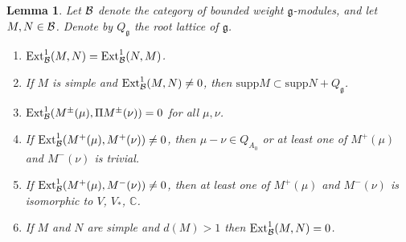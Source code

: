 \documentclass[12pt]{amsart}
\def\mathcal{\cal}
\theoremstyle{plain} %
\numberwithin{equation}{section}
\theoremstyle{definition}
\theoremstyle{remark}
\theoremstyle{plain} %
\newtheorem{lemma}[definition]{Lemma}
\renewcommand{\gg}{\mathfrak{g}}
\newcommand{\Ext}{\mathrm{Ext}}
\newcommand{\supp}{\mathrm{supp}}
\newcommand{\C}{\mathbb{C}}
\def\gg{\mathfrak{g}}
\begin{document}
          \begin{lemma}\label{extensions} Let $\mathcal B$ denote the category of bounded weight $\gg$-modules, and let $M,N \in \mathcal B$. Denote by $Q_{\gg}$ the root lattice of $\gg$.
            \begin{enumerate}
            \item[(a)]  $\Ext_{\mathcal B}^1(M,N)=\Ext_{\mathcal B}^1(N,M)$.
              \item[(b)] If $M$ is simple and $\Ext_{\mathcal B}^1(M,N)\neq 0$, then $\supp M\subset \supp N+Q_{\gg}$.
             \item[(c)] $\Ext_{\mathcal B}^1(M^{\pm} (\mu),\Pi M^{\pm} (\nu)) =  0$ for all $\mu,\nu$.
            \item[(d)] If $\Ext_{\mathcal B}^1(M^+(\mu),M^+(\nu))\neq 0$, then $\mu-\nu\in Q_{A_0}$ or at least one of $M^+(\mu)$ and $M^-(\nu)$ is trivial.
            \item[(e)] If $\Ext_{\mathcal B}^1(M^+(\mu),M^-(\nu))\neq 0$, then at least one of $M^+(\mu)$ and $M^-(\nu)$ is isomorphic to $V$, $V_*$, $\C$.
              \item[(f)] If $M$ and $N$ are simple and $d(M)>1$ then $\Ext_{\mathcal B}^1(M,N)=0$.              \end{enumerate}           
          \end{lemma}
\end{document}
